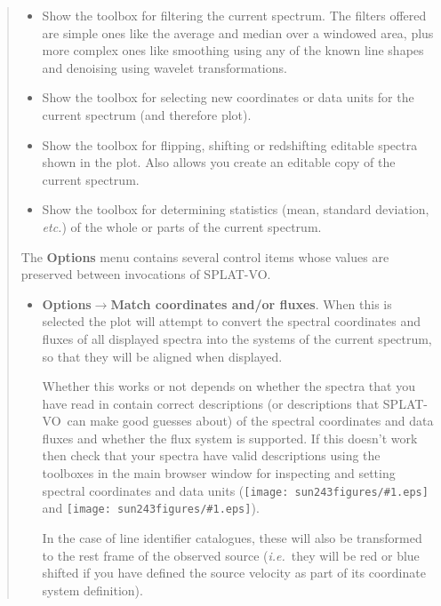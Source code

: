\documentclass[twoside,11pt]{article}
\newcommand{\htmladdimg}[1]{}
\newcommand{\latexhtml}[2]{#1}
\renewcommand{\_}{\texttt{\symbol{95}}}
\newcommand{\SPLAT}{\textsf{SPLAT-VO}}
\newcommand{\inline}[1]
        {\latexhtml{\texttt{[image: sun243\_figures/\#1.eps]}}
        {\htmladdimg[align=center]{#1.gif}}}
\newcommand{\menuitem}[1]{\textbf{#1}}
\newcommand{\submenuitem}[2]{\latexhtml{\textbf{#1$\rightarrow$#2}}{\textbf{#1->#2}}}
\newcommand{\ie}{\textit{i.e.}}
\newcommand{\etc}{\textit{etc.}}
\begin{document}
\begin{quote}
\begin{itemize}
  \item[\inline{filter}] Show the toolbox for filtering the current
  spectrum. The filters offered are simple ones like the average and
  median over a windowed area, plus more complex ones like smoothing
  using any of the known line shapes and denoising using wavelet
  transformations.

  \item[\inline{units}] Show the toolbox for selecting new coordinates or
  data units for the current spectrum (and therefore plot).

  \item[\inline{flip}] Show the toolbox for flipping, shifting or redshifting
  editable spectra shown in the plot. Also allows you create an editable copy
  of the current spectrum.

  \item[\inline{sigma}] Show the toolbox for determining statistics (mean,
  standard deviation, \etc) of the whole or parts of the current spectrum.

 \end{itemize}

 The \menuitem{Options} menu contains several control items whose values are
 preserved between invocations of \SPLAT.

 \begin{itemize}

  \item \submenuitem{Options}{Match coordinates and/or fluxes}.
  When this is selected the plot will attempt to convert the spectral
  coordinates and fluxes of all displayed spectra into the systems of the
  current spectrum, so that they will be aligned when displayed.

  Whether this works or not depends on whether the spectra that you have read
  in contain correct descriptions (or descriptions that \SPLAT\ can make good
  guesses about) of the spectral coordinates and data fluxes and whether the
  flux system is supported. If this doesn't work then check that your spectra
  have valid descriptions using the toolboxes in the main browser window for
  inspecting and setting spectral coordinates and data units
  (\inline{xunits} and \inline{yunits}).

  In the case of line identifier catalogues, these will also be transformed to
  the rest frame of the observed source (\ie\ they will be red or blue shifted
  if you have defined the source velocity as part of its coordinate system
  definition).


\end{itemize}
\end{quote}
\end{document}
